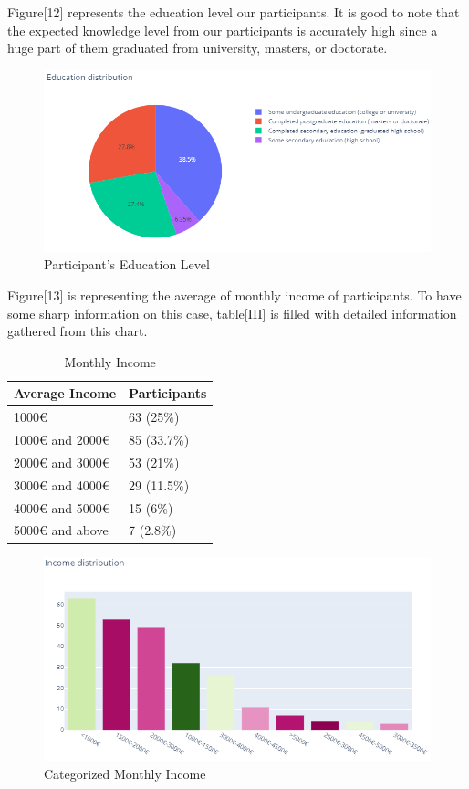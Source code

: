 \documentclass[letterpaper, 10 pt, conference]{ieeeconf}
\begin{document}
Figure[12] represents the education level our participants. It is good to note that the expected knowledge level from our participants is accurately high since a huge part of them graduated from university, masters, or doctorate. \\

\begin{figure}[!ht]
    \centering
    \includegraphics[scale = 0.4]{Picture12.png}
    \caption{Participant's Education Level}
\end{figure}

Figure[13] is representing the average of monthly income of participants. To have some sharp information on this case, table[III] is filled with detailed information gathered from this chart.
   

\begin{table}[!ht]
\begin{tabular}{ | m{4cm} | m{3.8cm}| }
\hline
Average Income  & Participants  \\ 
\hline
1000€           & 63 (25\%)     \\ 
\hline
1000€ and 2000€ & 85 (33.7\%)   \\ 
\hline
2000€ and 3000€ & 53 (21\%)     \\ 
\hline
3000€ and 4000€ & 29 (11.5\%)   \\ 
\hline
4000€ and 5000€ & 15 (6\%)      \\ 
\hline
5000€ and above & 7 (2.8\%)     \\
\hline
\end{tabular}
\caption{\label{demo-table}Monthly Income}
\end{table}


\begin{figure}[!ht]
    \centering
    \includegraphics[scale = 0.4]{Picture13.png}
    \caption{Categorized Monthly Income}
\end{figure}
\end{document}
